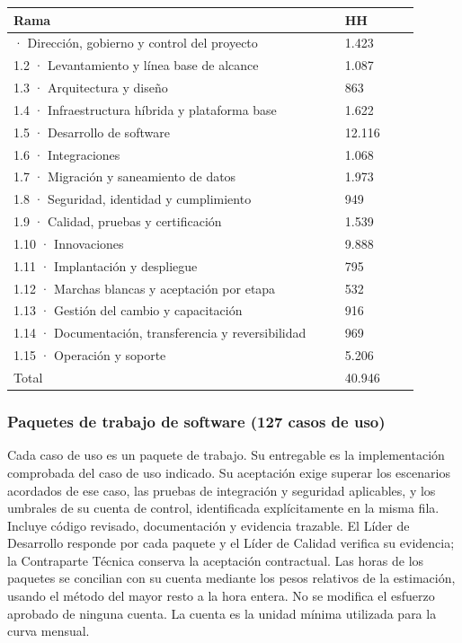 \begin{longtable}{@{}p{0.755\linewidth}p{0.175\linewidth}@{}}
\toprule
\textbf{Rama} & \textbf{HH} \\
\midrule
\endhead
\bottomrule
\endlastfoot
1.1 · Dirección, gobierno y control del proyecto & 1.423 \\
1.2 · Levantamiento y línea base de alcance & 1.087 \\
1.3 · Arquitectura y diseño & 863 \\
1.4 · Infraestructura híbrida y plataforma base & 1.622 \\
1.5 · Desarrollo de software & 12.116 \\
1.6 · Integraciones & 1.068 \\
1.7 · Migración y saneamiento de datos & 1.973 \\
1.8 · Seguridad, identidad y cumplimiento & 949 \\
1.9 · Calidad, pruebas y certificación & 1.539 \\
1.10 · Innovaciones & 9.888 \\
1.11 · Implantación y despliegue & 795 \\
1.12 · Marchas blancas y aceptación por etapa & 532 \\
1.13 · Gestión del cambio y capacitación & 916 \\
1.14 · Documentación, transferencia y reversibilidad & 969 \\
1.15 · Operación y soporte & 5.206 \\
Total & 40.946 \\
\end{longtable}

\subsubsection{Paquetes de trabajo de software (127 casos de uso)}

Cada caso de uso es un paquete de trabajo. Su entregable es la implementación comprobada del caso de uso indicado. Su aceptación exige superar los escenarios acordados de ese caso, las pruebas de integración y seguridad aplicables, y los umbrales de su cuenta de control, identificada explícitamente en la misma fila. Incluye código revisado, documentación y evidencia trazable. El Líder de Desarrollo responde por cada paquete y el Líder de Calidad verifica su evidencia; la Contraparte Técnica conserva la aceptación contractual. Las horas de los paquetes se concilian con su cuenta mediante los pesos relativos de la estimación, usando el método del mayor resto a la hora entera. No se modifica el esfuerzo aprobado de ninguna cuenta. La cuenta es la unidad mínima utilizada para la curva mensual.

